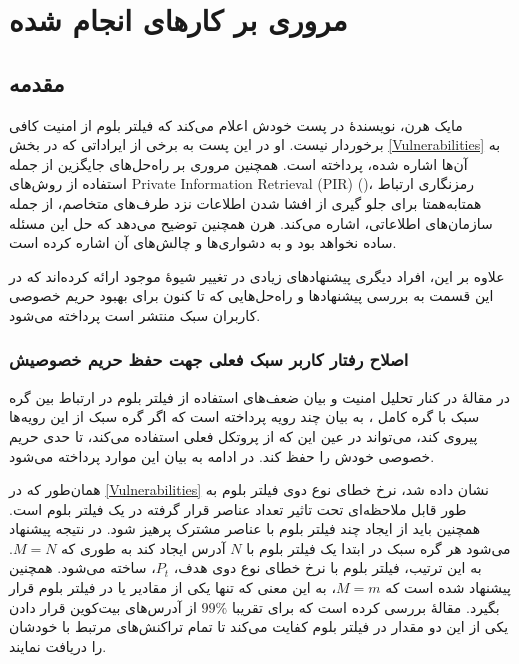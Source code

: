 \chapter{مروری بر کار‌های انجام شده}
\label{LitReview}
\section{مقدمه}

مایک هرن، نویسندهٔ  \cite{Hearn2013}
در پست \cite{Hearn2015} خودش اعلام می‌کند که فیلتر بلوم از امنیت کافی برخوردار نیست. او در این پست به برخی از ایراداتی که در بخش \ref{Vulnerabilities} به آن‌ها اشاره شده، پرداخته است. همچنین مروری بر راه‌حل‌های جایگزین از جمله استفاده از روش‌های 
\gls{Private Information Retrieval (PIR)}
()، رمزنگاری ارتباط همتا‌به‌همتا برای جلو گیری از افشا شدن اطلاعات نزد طرف‌های متخاصم، از جمله سازمان‌های اطلاعاتی، اشاره می‌کند. هرن همچنین توضیح می‌دهد که حل این مسئله ساده نخواهد بود و به دشواری‌ها و چالش‌های آن اشاره کرده است\cite{Hearn2015}.

علاوه بر این، افراد دیگری پیشنهاد‌های زیادی در تغییر شیوهٔ موجود ارائه کرده‌اند که در این قسمت به بررسی پیشنهاد‌ها و راه‌حل‌هایی که تا کنون برای بهبود حریم خصوصی کاربران سبک منتشر است پرداخته می‌شود. 


\subsection{
اصلاح رفتار کاربر سبک فعلی جهت حفظ حریم خصوصیش
}
\label{change_behaviour}
در مقالهٔ \cite{Gervais2014} در کنار تحلیل امنیت و بیان ضعف‌های استفاده از فیلتر بلوم در ارتباط بین گره سبک با گره کامل \cite{Hearn2013}، به بیان چند رویه پرداخته است که اگر گره سبک از این رویه‌ها پیروی کند، می‌تواند در عین این که از پروتکل فعلی استفاده می‌کند، تا حدی حریم خصوصی خودش را حفظ کند. در ادامه به بیان این موارد پرداخته می‌شود.

	همان‌طور که در \ref{Vulnerabilities} نشان داده شد، نرخ خطای نوع دوی فیلتر بلوم به طور قابل ملاحظه‌ای تحت تاثیر تعداد عناصر قرار گرفته در یک فیلتر بلوم است. همچنین باید از ایجاد چند فیلتر بلوم با عناصر مشترک پرهیز شود. در نتیجه پیشنهاد می‌شود هر گره سبک در ابتدا یک فیلتر بلوم با $N$ آدرس ایجاد کند به طوری که $M=N$. به این ترتیب، فیلتر بلوم با نرخ خطای نوع دوی هدف، $P_t$، ساخته می‌شود. همچنین پیشنهاد شده است که $M=m$، به این معنی که تنها یکی از مقادیر  یا  در فیلتر بلوم قرار بگیرد. مقالهٔ \cite{Gervais2014} بررسی کرده است که برای تقریبا $99\%$ از آدرس‌های بیت‌کوین قرار دادن یکی از این دو مقدار در فیلتر بلوم کفایت می‌کند تا تمام تراکنش‌های مرتبط  با خودشان را دریافت نمایند.
	
